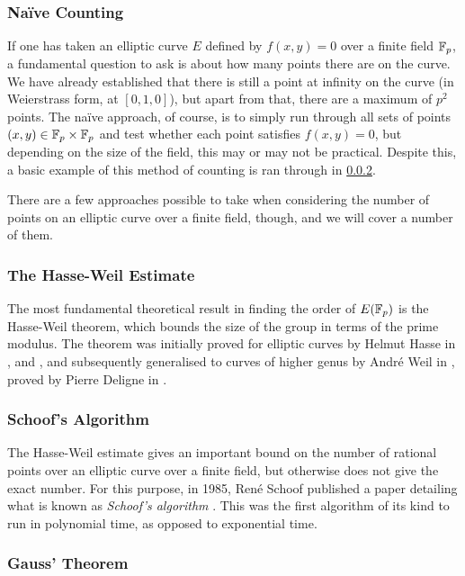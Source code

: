 \subsubsection{Naïve Counting}
If one has taken an elliptic curve $E$ defined by $f(x,y)=0$ over a finite field $\mathbb{F}_{p}$, a fundamental question to ask is about how many points there are on the curve.
We have already established that there is still a point at infinity on the curve (in Weierstrass form, at $[0,1,0]$), but apart from that, there are a maximum of $p^2$ points. %
The naïve approach, of course, is to simply run through all sets of points $(x,y) \in \mathbb{F}_{p} \times \mathbb{F}_{p}$ and test whether each point satisfies $f(x,y)=0$, but depending on the size of the field, this may or may not be practical.
Despite this, a basic example of this method of counting is ran through in \cref{hasseweil}.

There are a few approaches possible to take when considering the number of points on an elliptic curve over a finite field, though, and we will cover a number of them.
\subsubsection{The Hasse-Weil Estimate}
\label{hasseweil}
The most fundamental theoretical result in finding the order of $E(\mathbb{F}_{p})$ is the Hasse-Weil theorem, which bounds the size of the group in terms of the prime modulus.
The theorem was initially proved for elliptic curves by Helmut Hasse in \cite{hasse1936a}, \cite{hasse1936b} and \cite{hasse1936c}, and subsequently generalised to curves of higher genus by André Weil in \cite{weil1948}, proved by Pierre Deligne in \cite{deligne1974}.

\subsubsection{Schoof's Algorithm}
The Hasse-Weil estimate gives an important bound on the number of rational points over an elliptic curve over a finite field, but otherwise does not give the exact number.
For this purpose, in 1985, René Schoof published a paper detailing what is known as \emph{Schoof's algorithm} \cite{schoof1995}.
This was the first algorithm of its kind to run in polynomial time, as opposed to exponential time.
\subsubsection{Gauss' Theorem}

